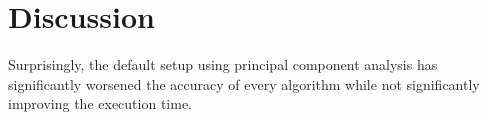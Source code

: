 \chapter{Discussion}
Surprisingly, the default setup using principal component analysis has significantly worsened the accuracy of every algorithm while not significantly improving the execution time.
